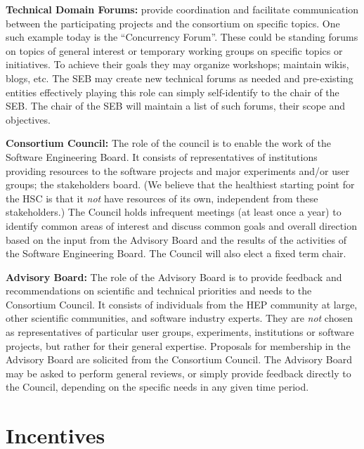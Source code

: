 \documentclass[12pt,letterpaper,fleqn]{article}
\begin{document}
{\bf Technical Domain Forums:} provide coordination and facilitate
communication between the participating projects and the consortium
on specific topics. One such example today is the ``Concurrency Forum''.
These could be standing forums on topics of general interest or
temporary working groups on specific topics or initiatives.
To achieve their goals they may organize workshops; maintain wikis,
blogs, etc. The SEB may create new technical forums as needed and pre-existing entities effectively playing this role can simply self-identify
to the chair of the SEB. The chair of the SEB will maintain a list
of such forums, their scope and objectives.

{\bf Consortium Council:} The role of the council is to enable the
work of the Software Engineering Board.
It consists of representatives of
institutions providing resources to the software projects
and major experiments and/or user groups; the stakeholders board.
(We believe that the healthiest starting point
for the HSC is that it {\em not} have resources of its own, independent
from these stakeholders.)
The Council holds infrequent meetings (at least once a year) to 
identify common areas of interest and discuss common goals and overall
direction based on the input from the Advisory Board and the results of the activities of the Software Engineering Board. The Council will
also elect a fixed term chair. 

{\bf Advisory Board:} The role of the Advisory Board is to provide
feedback and recommendations on scientific and technical priorities
and needs to the Consortium Council. It consists of individuals from
the HEP community at large, other scientific communities, and
software industry experts. They are {\em not} chosen as representatives
of particular user groups, experiments, institutions or software
projects, but rather for their general expertise.
Proposals for membership in the Advisory Board are solicited from the Consortium Council. The Advisory Board may be asked to perform general
reviews, or simply provide feedback directly to the Council, depending
on the specific needs in any given time period. 


\section{Incentives}
\end{document}
